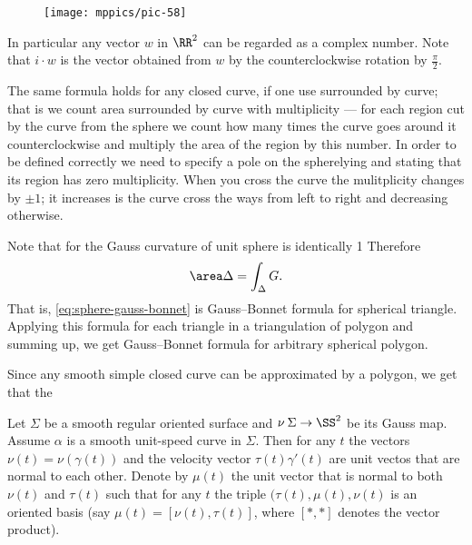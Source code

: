{

\begin{wrapfigure}{r}{20 mm}
\vskip-0mm
\centering
\texttt{[image: mppics/pic-58]}
\vskip0mm
\end{wrapfigure}

In particular any vector $w$ in $\RR^2$ can be regarded as a complex number.
Note that $i\cdot w$ is the vector obtained from $w$ by the counterclockwise rotation by $\tfrac\pi2$.

}































The same formula holds for any closed curve, if one use  surrounded by curve;
that is we count area surrounded by curve with multiplicity --- for each region cut by the curve from the sphere we count how many times the curve goes around it counterclockwise and multiply the area of the region by this number.
In order to be defined correctly we need to specify a pole on the spherelying and stating that its region has zero multiplicity. 
When you cross the curve the mulitplicity changes by $\pm1$; it increases is the curve cross the ways from left to right and decreasing otherwise.

Note that for the Gauss curvature of unit sphere is identically 1
Therefore 
\[\area\Delta=\int_\Delta G.\]
That is, \ref{eq:sphere-gauss-bonnet} is Gauss--Bonnet formula for spherical triangle.
Applying this formula for each triangle in a  triangulation of polygon and summing up, we get Gauss--Bonnet formula for arbitrary spherical polygon.

Since any smooth simple closed curve can be approximated by a polygon, we get that the 





Let $\Sigma$ be a smooth regular oriented surface and $\nu\:\Sigma\to \SS^2$ be its Gauss map.
Assume $\alpha$ is a smooth unit-speed curve in $\Sigma$. 
Then for any $t$ the vectors $\nu(t)=\nu(\gamma(t))$ and the velocity vector $\tau(t)\gamma'(t)$ are unit vectos that are normal to each other.
Denote by $\mu(t)$ the unit vector that is normal to both $\nu(t)$ and $\tau(t)$ such that for any $t$ the triple $(\tau(t),\mu(t),\nu(t)$ is an oriented basis (say $\mu(t)=[\nu(t),\tau(t)]$, where $[{*},{*}]$ denotes the vector product).

